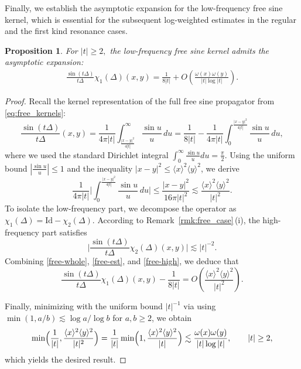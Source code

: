 \documentclass[reqno]{amsart}
\newtheorem{proposition}[theorem]{Proposition}
\numberwithin{equation}{section}
\begin{document}
Finally, we  establish the asymptotic expansion for the low-frequency free sine kernel,
which is essential for the subsequent log-weighted estimates in the regular and the first kind resonance cases.
\begin{proposition}\label{prop_free_sin}
For $|t| \ge 2,$ the low-frequency free sine kernel admits the asymptotic expansion:
$$
\begin{aligned}
\frac{\sin(t\Delta)}{t\Delta}\chi_1(\Delta)(x,y)
=\frac{1}{8 |t|}+O\left(\frac{\omega(x)\omega(y)}{|t|\log|t|}\right).
\end{aligned}
$$
\end{proposition}
\begin{proof}
	Recall the kernel representation of the full free sine propagator from \eqref{eq:free_kernels}:
	\begin{equation}\label{free-whole}
		\frac{\sin(t\Delta)}{t\Delta}(x,y)
		= \frac{1}{4\pi |t|}\int_{\frac{|x-y|^2}{4|t|}}^{\infty}\frac{\sin u}{u}\,du
		= \frac{1}{8|t|} - \frac{1}{4\pi |t|}\int^{\frac{|x-y|^2}{4|t|}}_{0}\frac{\sin u}{u}\,du,
	\end{equation}
	where we used the standard Dirichlet integral $\int_0^\infty \frac{\sin u}{u} du = \frac{\pi}{2}$.
	Using the uniform bound $|\frac{\sin u}{u}| \le 1$ and the inequality $|x-y|^2 \le \langle x \rangle^2 \langle y \rangle^2$, we derive 
	\begin{equation}\label{free-est}
		 \frac{1}{4\pi |t|}\Big| \int_{0}^{\frac{|x-y|^2}{4|t|}} \frac{\sin u}{u} \, du \Big| \le \frac{|x-y|^2}{16\pi |t|^2} \lesssim \frac{\langle x \rangle^2 \langle y \rangle^2}{|t|^2}.
	\end{equation}
To isolate the low-frequency part, we decompose the operator as $\chi_1(\Delta) = \mathrm{Id} - \chi_2(\Delta)$.	According to Remark~\ref{rmk:free_case}\,(i), the high-frequency part satisfies
	\begin{equation}\label{free-high}
		\Big| \frac{\sin(t\Delta)}{t\Delta}\chi_2(\Delta)(x,y) \Big| \lesssim |t|^{-2}.
	\end{equation}
	Combining \eqref{free-whole}, \eqref{free-est}, and \eqref{free-high}, we deduce that
	\[
	\frac{\sin(t\Delta)}{t\Delta}\chi_1(\Delta)(x,y) -\frac{1}{8 |t|} ={O}\!\left(\frac{\langle x\rangle^2\langle y\rangle^2}{|t|^2}\right).
	\]
    
	Finally, minimizing with the uniform bound $|t|^{-1}$ via using $\min(1,a/b) \lesssim \log a/\log b$ for $a,b\ge 2$, we obtain
	\[
	\min\Bigl(\frac{1}{|t|}, \frac{\langle x\rangle^2\langle y\rangle^2}{|t|^2}\Bigr)
	= \frac{1}{|t|} \min\Bigl(1, \frac{\langle x\rangle^2\langle y\rangle^2}{|t|}\Bigr)
	\lesssim \frac{\omega(x)\omega(y)}{|t|\log|t|}, \qquad |t| \ge 2,
	\]
	which yields the desired result.
\end{proof}
\end{document}
